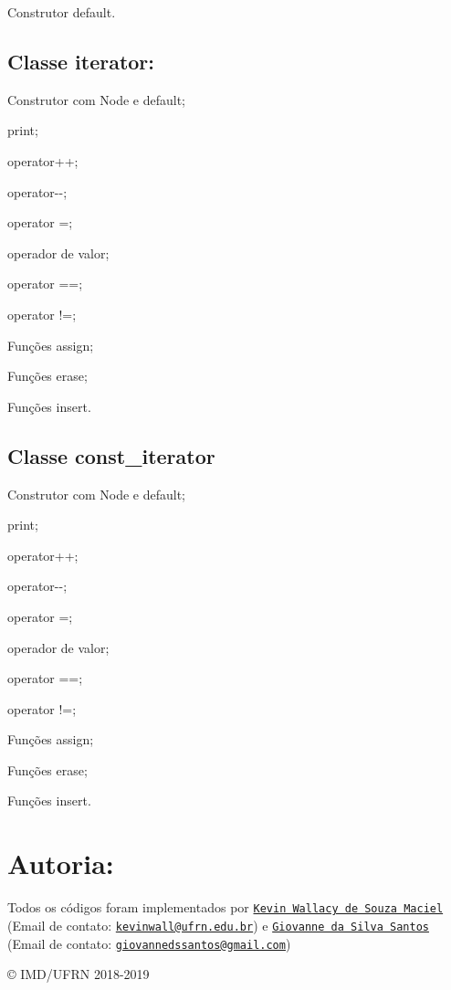 \begin{DoxyItemize}
\item Construtor default.
\end{DoxyItemize}

\subsection*{Classe iterator\+:}


\begin{DoxyItemize}
\item Construtor com Node e default;
\item print;
\item operator++;
\item operator-\/-\/;
\item operator =;
\item operador de valor;
\item operator ==;
\item operator !=;
\item Funções assign;
\item Funções erase;
\item Funções insert.
\end{DoxyItemize}

\subsection*{Classe const\+\_\+iterator}


\begin{DoxyItemize}
\item Construtor com Node e default;
\item print;
\item operator++;
\item operator-\/-\/;
\item operator =;
\item operador de valor;
\item operator ==;
\item operator !=;
\item Funções assign;
\item Funções erase;
\item Funções insert.
\end{DoxyItemize}

\section*{Autoria\+:}

Todos os códigos foram implementados por \href{https://github.com/kevinwall}{\tt Kevin Wallacy de Souza Maciel} (Email de contato\+: \href{mailto:kevinwall@ufrn.edu.br}{\tt kevinwall@ufrn.\+edu.\+br}) e \href{https://github.com/GSDante}{\tt Giovanne da Silva Santos} (Email de contato\+: \href{mailto:giovannedssantos@gmail.com}{\tt giovannedssantos@gmail.\+com})

\copyright{} I\+M\+D/\+U\+F\+RN 2018-\/2019 